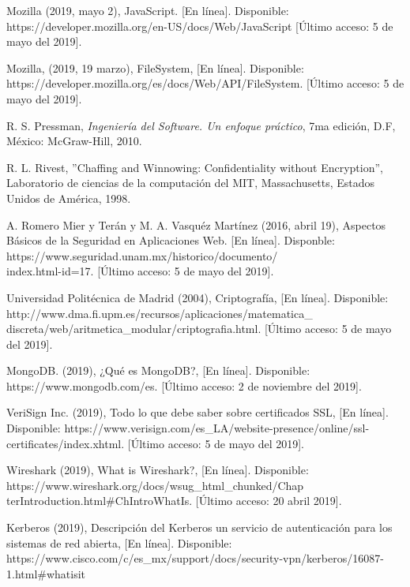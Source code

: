 \documentclass[12pt, a4paper, titlepage]{report}
\begin{document}
\begin{thebibliography}{20}
		Mozilla (2019, mayo 2), JavaScript. [En línea]. Disponible:
		https://developer.mozilla.org/en-US/docs/Web/JavaScript [Último acceso: 5 de mayo del 2019].
		
        Mozilla, (2019, 19 marzo), FileSystem, [En línea]. Disponible: https://developer.mozilla.org/es/docs/Web/API/FileSystem. [Último acceso: 5 de mayo del 2019].
		
		R. S. Pressman, \textit{Ingeniería del Software. Un enfoque práctico}, 7ma edición, D.F, México: McGraw-Hill, 2010.
		
		R. L. Rivest, ''Chaffing and Winnowing: Confidentiality without Encryption'', Laboratorio de ciencias de la computación del MIT, Massachusetts, Estados Unidos de América, 1998.
		
		A. Romero Mier y Terán y M. A. Vasquéz Martínez (2016, abril 19), Aspectos Básicos de la Seguridad en Aplicaciones Web. [En línea]. Disponble: https://www.seguridad.unam.mx/historico/documento/\\index.html-id=17. [Último acceso: 5 de mayo del 2019].
        
	    Universidad Politécnica de Madrid (2004), Criptografía, [En línea]. Disponible: http://www.dma.fi.upm.es/recursos/aplicaciones/matematica\_ discreta/web/aritmetica\_modular/criptografia.html. [Último acceso: 5 de mayo del 2019].
	    
	    MongoDB. (2019), ¿Qué es MongoDB?, [En línea]. Disponible: https://www.mongodb.com/es. [Último acceso: 2 de noviembre del 2019].
	    
        VeriSign Inc. (2019), Todo lo que debe saber sobre certificados SSL, [En línea]. Disponible: https://www.verisign.com/es\_LA/website-presence/online/ssl-certificates/index.xhtml. [Último acceso: 5 de mayo del 2019].
        
        Wireshark (2019), What is Wireshark?, [En línea]. Disponible: https://www.wireshark.org/docs/wsug\_html\_chunked/Chap\\terIntroduction.html\#ChIntroWhatIs. [Último acceso: 20 abril 2019].
        
        Kerberos (2019), Descripción del Kerberos un servicio de autenticación para los sistemas de red abierta, [En línea]. Disponible: https://www.cisco.com/c/es\_mx/support/docs/security-vpn/kerberos/16087-1.html\#whatisit
        

\end{thebibliography}
\end{document}
